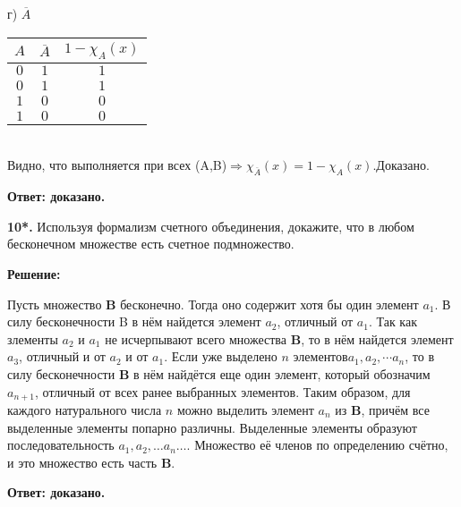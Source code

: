 \documentclass[a4paper,12pt]{article} %
\begin{document}
г) $\overline{A}$\\
\begin{tabular}{ | c | c | c |}
\hline
$A$ & $\overline{A}$ & $1 - \chi_{A}(x)$\\ \hline
$0$ & $1$ & $1$\\
$0$ & $1$ & $1$\\
$1$ & $0$ & $0$\\
$1$ & $0$ & $0$\\
\hline 
\end{tabular}\\
Видно, что выполняется при всех (A,B)$ \Rightarrow \chi_{\overline{A}}(x) = 1 - \chi_{A}(x).$Доказано.



\begin{flushright}
\begin{large}
\textbf {Ответ: доказано.}
\end{large}
\end{flushright}

{\bf 10*. }Используя формализм счетного объединения, докажите, что в любом бесконечном множестве есть счетное подмножество.

\begin{center}
\bfseries
{\Large Решение: }
\end{center}
Пусть множество {\bf B} бесконечно. Тогда оно содержит хотя бы один элемент $a_{1}$. В силу бесконечности B в нём найдется элемент $a_{2}$, отличный от $a_{1}$. Так как злементы $a_{2}$ и $a_{1}$ не исчерпывают всего множества {\bf B}, то в нём найдется элемент $a_{3}$, отличный и от $a_{2}$ и от $a_{1}$. Если уже выделено $n$ элементов$ a_{1}, a_{2},\cdots a_{n}$, то в силу бесконечности {\bf B} в нём найдётся еще один элемент, который обозначим $a_{n+1}$, отличный от всех ранее выбранных элементов. Таким образом, для каждого натурального числа $n$ можно выделить элемент $a_{n}$ из {\bf B}, причём все выделенные элементы попарно различны. Выделенные элементы образуют последовательность $ a_{1}, a_{2},\dots a_{n} \dots $. Множество её членов по определению счётно, и это множество есть часть {\bf B}.




\begin{flushright}
\begin{large}
\textbf {Ответ: доказано.}
\end{large}
\end{flushright}
\end{document}
